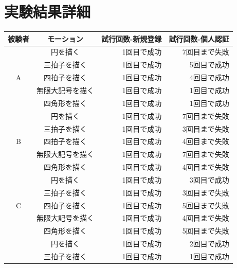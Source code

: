 \documentclass[11pt]{jreport}
\begin{document}
\chapter{実験結果詳細}
\label{detail}
        \begin{center}
            \begin{longtable}{|c|c|r|r|}
            \hline
                被験者 & モーション & 試行回数-新規登録 & 試行回数-個人認証 \\ \hline \hline \endhead
                  & 円を描く & 1回目で成功 & 7回目まで失敗 \\ \cline{2-4} %
                  & 三拍子を描く & 1回目で成功 & 5回目で成功 \\ \cline{2-4}
                A & 四拍子を描く & 1回目で成功 & 4回目で成功 \\ \cline{2-4}
                  & 無限大記号を描く & 1回目で成功 & 1回目で成功 \\ \cline{2-4}
                  & 四角形を描く & 1回目で成功 & 1回目で成功 \\ \hline %
                  & 円を描く & 1回目で成功 & 7回目まで失敗 \\ \cline{2-4} %
                  & 三拍子を描く & 1回目で成功 & 3回目まで失敗 \\ \cline{2-4}
                B & 四拍子を描く & 1回目で成功 & 4回目まで失敗 \\ \cline{2-4}
                  & 無限大記号を描く & 1回目で成功 & 7回目まで失敗 \\ \cline{2-4}
                  & 四角形を描く & 1回目で成功 & 4回目まで失敗 \\ \hline %
                  & 円を描く & 1回目で成功 & 3回目で成功 \\ \cline{2-4} %
                  & 三拍子を描く & 1回目で成功 & 3回目まで失敗 \\ \cline{2-4}
                C & 四拍子を描く & 1回目で成功 & 5回目まで失敗 \\ \cline{2-4}
                  & 無限大記号を描く & 1回目で成功 & 4回目まで失敗 \\ \cline{2-4}
                  & 四角形を描く & 1回目で成功 & 5回目まで失敗 \\ \hline %
                  & 円を描く & 1回目で成功 & 2回目で成功 \\ \cline{2-4} %
                  & 三拍子を描く & 1回目で成功 & 1回目で成功 \\ \cline{2-4}

\end{longtable}
\end{center}
\end{document}
